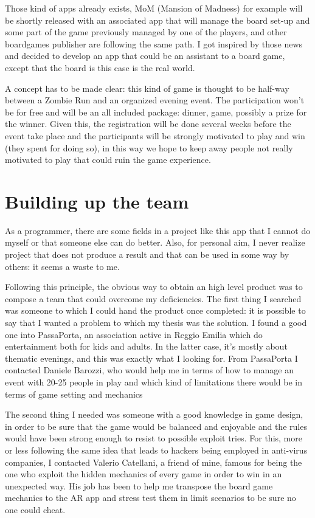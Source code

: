 		Those kind of apps already exists, MoM (Mansion of Madness) for example will be shortly released with an associated app that will manage the board set-up and some part of the game previously managed by one of the players, and other boardgames publisher are following the same path.
		I got inspired by those news and decided to develop an app that could be an assistant to a board game, except that the board is this case is the real world.
		
		A concept has to be made clear: this kind of game is thought to be half-way between a Zombie Run and an organized evening event.
		The participation won't be for free and will be an all included package: dinner, game, possibly a prize for the winner.
		Given this, the registration will be done several weeks before the event take place and the participants will be strongly motivated to play and win (they spent for doing so), in this way we hope to keep away people not really motivated to play that could ruin the game experience.
	
	\section{Building up the team}	
		
		As a programmer, there are some fields in a project like this app that I cannot do myself or that someone else can do better.
		Also, for personal aim, I never realize project that does not produce a result and that can be used in some way by others: it seems a waste to me.
		
		Following this principle, the obvious way to obtain an high level product was to compose a team that could overcome my deficiencies.
		The first thing I searched was someone to which I could hand the product once completed: it is possible to say that I wanted a problem to which my thesis was the solution.
		I found a good one into PassaPorta, an association active in Reggio Emilia which do entertainment both for kids and adults.
		In the latter case, it's mostly about thematic evenings, and this was exactly what I looking for.
		From PassaPorta I contacted Daniele Barozzi, who would help me in terms of how to manage an event with 20-25 people in play and which kind of limitations there would be in terms of game setting and mechanics
		
		The second thing I needed was someone with a good knowledge in game design, in order to be sure that the game would be balanced and enjoyable and the rules would have been strong enough to resist to possible exploit tries.
		For this, more or less following the same idea that leads to hackers being employed in anti-virus companies, I contacted Valerio Catellani, a friend of mine, famous for being the one who exploit the hidden mechanics of every game in order to win in an unexpected way. His job has been to help me transpose the board game mechanics to the AR app and stress test them in limit scenarios to be sure no one could cheat.
		

